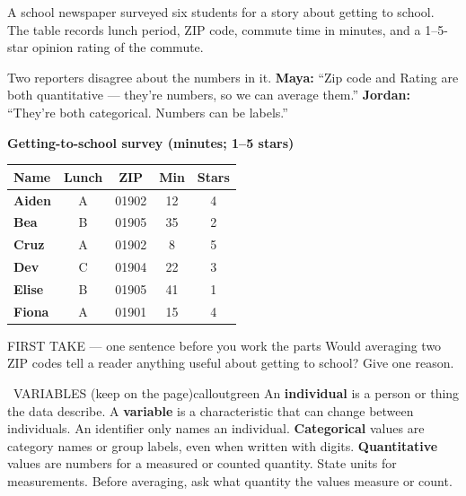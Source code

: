 \documentclass[11pt]{article}
\begin{document}


A school newspaper surveyed six students for a story about getting to school. The table records lunch period, ZIP code, commute time in minutes, and a 1--5-star opinion rating of the commute.\par\smallskip Two reporters disagree about the numbers in it. \textbf{Maya:} ``Zip code and Rating are both quantitative --- they're numbers, so we can average them.'' \textbf{Jordan:} ``They're both categorical. Numbers can be labels.''\par
\begin{center}
\textbf{Getting-to-school survey (minutes; 1--5 stars)}\par\smallskip
\begin{tabular}{|l|c|c|c|c|}
\hline
\textbf{Name} & \textbf{Lunch} & \textbf{ZIP} & \textbf{Min} & \textbf{Stars} \\ \hline
\textbf{Aiden} & A & 01902 & 12 & 4 \\ \hline
\textbf{Bea} & B & 01905 & 35 & 2 \\ \hline
\textbf{Cruz} & A & 01902 & 8 & 5 \\ \hline
\textbf{Dev} & C & 01904 & 22 & 3 \\ \hline
\textbf{Elise} & B & 01905 & 41 & 1 \\ \hline
\textbf{Fiona} & A & 01901 & 15 & 4 \\ \hline
\end{tabular}
\end{center}
\begin{firsttakebox}{FIRST TAKE --- one sentence before you work the parts}
Would averaging two ZIP codes tell a reader anything useful about getting to school? Give one reason.
\workspace{0.9in}
\end{firsttakebox}

\begin{callout}{\IconBook\ VARIABLES (keep on the page)}{calloutgreen}
An \textbf{individual} is a person or thing the data describe. A \textbf{variable} is a characteristic that can change between individuals. An identifier only names an individual. \textbf{Categorical} values are category names or group labels, even when written with digits. \textbf{Quantitative} values are numbers for a measured or counted quantity. State units for measurements. Before averaging, ask what quantity the values measure or count.
\end{callout}
\end{document}
